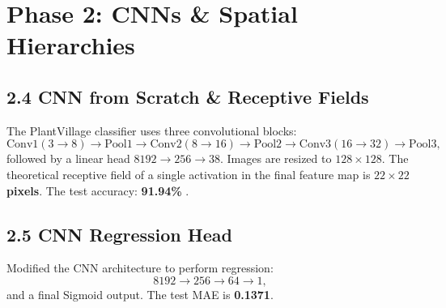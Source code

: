 \documentclass[12pt,a4paper]{article}
\begin{document}
\section{Phase 2: CNNs \& Spatial Hierarchies}

\subsection{2.4 CNN from Scratch \& Receptive Fields}
\vspace{6pt}
\begin{resultbox}
The PlantVillage classifier uses three convolutional blocks:
\[
\text{Conv1}(3\!\to\!8)\rightarrow\text{Pool1}\rightarrow
\text{Conv2}(8\!\to\!16)\rightarrow\text{Pool2}\rightarrow
\text{Conv3}(16\!\to\!32)\rightarrow\text{Pool3},
\]
followed by a linear head $8192 \rightarrow 256 \rightarrow 38$. Images are resized to $128\times128$. The theoretical receptive field of a single activation in the final feature map is \textbf{$22\times22$ pixels}. The test accuracy: \textbf{91.94\%} .
\end{resultbox}

\subsection{2.5 CNN Regression Head}
\vspace{6pt}
\begin{resultbox}
Modified the CNN architecture to perform regression:
\[
8192 \rightarrow 256 \rightarrow 64 \rightarrow 1,
\]
and a final Sigmoid output.
The test MAE is \textbf{0.1371}.
\end{resultbox}
\end{document}
